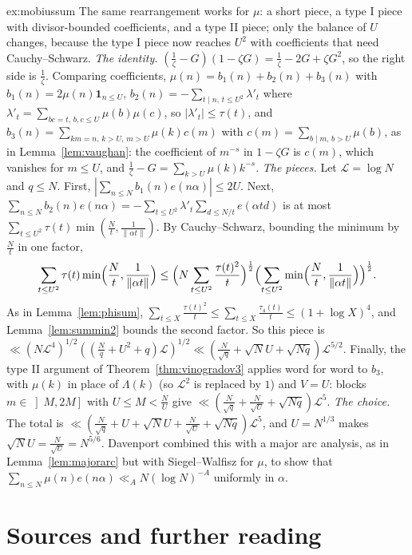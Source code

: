 \begin{solution}{ex:mobiussum}
\idea The same rearrangement works for $\mu$: a short piece, a type I piece with divisor-bounded coefficients, and a type II piece; only the balance of $U$ changes, because the type I piece now reaches $U^2$ with coefficients that need Cauchy--Schwarz.
\writeup \emph{The identity.} $(\frac1\zeta-G)(1-\zeta G)=\frac1\zeta-2G+\zeta G^2$, so the right side is $\frac1\zeta$. Comparing coefficients, $\mu(n)=b_1(n)+b_2(n)+b_3(n)$ with $b_1(n)=2\mu(n)\mathbf 1_{n\le U}$, $b_2(n)=-\sum_{t\mid n,\,t\le U^2}\lambda'_t$ where $\lambda'_t=\sum_{bc=t,\,b,c\le U}\mu(b)\mu(c)$, so $|\lambda'_t|\le\tau(t)$, and $b_3(n)=\sum_{km=n,\,k>U,\,m>U}\mu(k)c(m)$ with $c(m)=\sum_{b\mid m,\,b>U}\mu(b)$, as in Lemma~\ref{lem:vaughan}: the coefficient of $m^{-s}$ in $1-\zeta G$ is $c(m)$, which vanishes for $m\le U$, and $\frac1\zeta-G=\sum_{k>U}\mu(k)k^{-s}$.
\emph{The pieces.} Let $\mathcal L=\log N$ and $q\le N$. First, $|\sum_{n\le N}b_1(n)e(n\alpha)|\le2U$. Next, $\sum_{n\le N}b_2(n)e(n\alpha)=-\sum_{t\le U^2}\lambda'_t\sum_{d\le N/t}e(\alpha td)$ is at most $\sum_{t\le U^2}\tau(t)\min(\frac Nt,\frac1{\|\alpha t\|})$. By Cauchy--Schwarz, bounding the minimum by $\frac Nt$ in one factor,
\[
\sum_{t\le U^2}\tau(t)\min\Bigl(\frac Nt,\frac1{\|\alpha t\|}\Bigr)\le\Bigl(N\sum_{t\le U^2}\frac{\tau(t)^2}t\Bigr)^{\frac12}\Bigl(\sum_{t\le U^2}\min\Bigl(\frac Nt,\frac1{\|\alpha t\|}\Bigr)\Bigr)^{\frac12}.
\]
As in Lemma~\ref{lem:phisum}, $\sum_{t\le X}\frac{\tau(t)^2}t\le\sum_{t\le X}\frac{\tau_4(t)}t\le(1+\log X)^4$, and Lemma~\ref{lem:summin2} bounds the second factor. So this piece is $\ll(N\mathcal L^4)^{1/2}((\frac Nq+U^2+q)\mathcal L)^{1/2}\ll(\frac N{\sqrt q}+\sqrt NU+\sqrt{Nq})\mathcal L^{5/2}$. Finally, the type II argument of Theorem~\ref{thm:vinogradov3} applies word for word to $b_3$, with $\mu(k)$ in place of $\Lambda(k)$ (so $\mathcal L^2$ is replaced by $1$) and $V=U$: blocks $m\in\left]M,2M\right]$ with $U\le M<\frac NU$ give $\ll(\frac N{\sqrt q}+\frac N{\sqrt U}+\sqrt{Nq})\mathcal L^5$.
\emph{The choice.} The total is $\ll(\frac N{\sqrt q}+U+\sqrt NU+\frac N{\sqrt U}+\sqrt{Nq})\mathcal L^5$, and $U=N^{1/3}$ makes $\sqrt NU=\frac N{\sqrt U}=N^{5/6}$. Davenport combined this with a major arc analysis, as in Lemma~\ref{lem:majorarc} but with Siegel--Walfisz for $\mu$, to show that $\sum_{n\le N}\mu(n)e(n\alpha)\ll_AN(\log N)^{-A}$ uniformly in $\alpha$.
\end{solution}

\section*{Sources and further reading}

